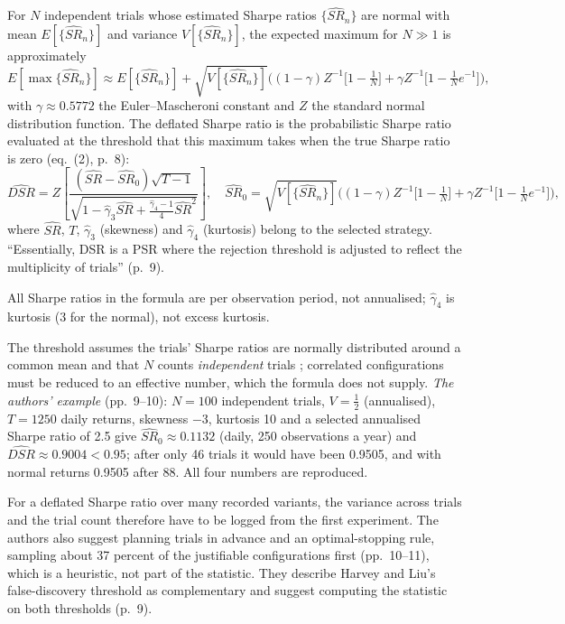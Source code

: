 \begin{qfmethod}\label{meth:deflated-sharpe-ratio}
 For $N$ independent trials whose estimated Sharpe ratios $\{\widehat{SR}_n\}$ are normal with mean $E[\{\widehat{SR}_n\}]$ and variance $V[\{\widehat{SR}_n\}]$, the expected maximum for $N\gg1$ is approximately \citep[eq.~(1), p.~7]{alpha-dsr}
\[ E[\max\{\widehat{SR}_n\}]\approx E[\{\widehat{SR}_n\}]+\sqrt{V[\{\widehat{SR}_n\}]}\Big((1-\gamma)Z^{-1}\big[1-\tfrac1N\big]+\gamma Z^{-1}\big[1-\tfrac1Ne^{-1}\big]\Big), \]
with $\gamma\approx0.5772$ the Euler--Mascheroni constant and $Z$ the standard normal distribution function. The deflated Sharpe ratio is the probabilistic Sharpe ratio evaluated at the threshold that this maximum takes when the true Sharpe ratio is zero (eq.~(2), p.~8):
\[ \widehat{DSR}=Z\!\left[\frac{(\widehat{SR}-\widehat{SR}_0)\sqrt{T-1}}{\sqrt{1-\hat\gamma_3\widehat{SR}+\frac{\hat\gamma_4-1}{4}\widehat{SR}^2}}\right],\quad \widehat{SR}_0=\sqrt{V[\{\widehat{SR}_n\}]}\Big((1-\gamma)Z^{-1}\big[1-\tfrac1N\big]+\gamma Z^{-1}\big[1-\tfrac1Ne^{-1}\big]\Big), \]
where $\widehat{SR}$, $T$, $\hat\gamma_3$ (skewness) and $\hat\gamma_4$ (kurtosis) belong to the selected strategy. ``Essentially, DSR is a PSR where the rejection threshold is adjusted to reflect the multiplicity of trials'' (p.~9).

 All Sharpe ratios in the formula are per observation period, not annualised; $\hat\gamma_4$ is kurtosis (3 for the normal), not excess kurtosis.

 The threshold assumes the trials' Sharpe ratios are normally distributed around a common mean and that $N$ counts \emph{independent} trials \citep[p.~7]{alpha-dsr}; correlated configurations must be reduced to an effective number, which the formula does not supply. \emph{The authors' example} (pp.~9--10): $N=100$ independent trials, $V=\tfrac12$ (annualised), $T=1250$ daily returns, skewness $-3$, kurtosis 10 and a selected annualised Sharpe ratio of 2.5 give $\widehat{SR}_0\approx0.1132$ (daily, 250 observations a year) and $\widehat{DSR}\approx0.9004<0.95$; after only 46 trials it would have been 0.9505, and with normal returns 0.9505 after 88. All four numbers are reproduced.

 For a deflated Sharpe ratio over many recorded variants, the variance across trials and the trial count therefore have to be logged from the first experiment. The authors also suggest planning trials in advance and an optimal-stopping rule, sampling about 37 percent of the justifiable configurations first (pp.~10--11), which is a heuristic, not part of the statistic. They describe Harvey and Liu's false-discovery threshold as complementary and suggest computing the statistic on both thresholds (p.~9).


\end{qfmethod}
